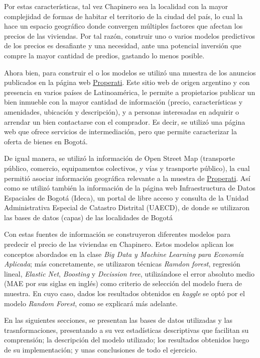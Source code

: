 \documentclass[
  11pt,
  letterpaper,
]{article}
\begin{document}
Por estas características, tal vez Chapinero sea la localidad con la mayor complejidad de formas de habitar el territorio de la ciudad del país, lo cual la hace un espacio geográfico donde convergen múltiples factores que afectan los precios de las viviendas. Por tal razón, construir uno o varios modelos predictivos de los precios es desafiante y una necesidad, ante una potencial inversión que compre la mayor cantidad de predios, gastando lo menos posible.

Ahora bien, para construir el o los modelos se utilizó una muestra de los anuncios publicados en la página web \href{ https://www.properati.com.co/}{Properati}. Este sitio web de origen argentino y con presencia en varios países de Latinoamérica, le permite a propietarios publicar un bien inmueble con la mayor cantidad de información (precio, características y amenidades, ubicación y descripción), y a personas interesadas en adquirir o arrendar un bien contactarse con el comprador. Es decir, se utilizó una página web que ofrece servicios de intermediación, pero que permite caracterizar la oferta de bienes en Bogotá.

De igual manera, se utilizó la información de Open Street Map (transporte público, comercio, equipamentos colectivos, y vías y trasnporte público), la cual permitió asociar información geográfica relevante a la muestra de \href{ https://www.properati.com.co/}{Properati}. Así como se utilizó también la información de la página web Infraestructura de Datos Espaciales de Bogotá (Ideca), un portal de libre acceso y consulta de la Unidad Administrativa Especial de Catastro Distrital (UAECD), de donde se utilizaron las bases de datos (capas) de las localidades de Bogotá

Con estas fuentes de información se construyeron diferentes modelos para predecir el precio de las viviendas en Chapinero. Estos modelos aplican los conceptos abordados en la clase \textit{Big Data y Machine Learning para Economía Aplicada}; más concretamente, se utilizaron técnicas \textit{Ramdon forest}, regresión lineal, \textit{Elastic Net}, \textit{Boosting} y \textit{Decission tree}, utilizándose el error absoluto medio (MAE por sus siglas en inglés) como criterio de selección del modelo fuera de muestra. En cuyo caso, dados los resultados obtenidos en \textit{kaggle} se optó por el modelo \textit{Random Forest}, como se explicará más adelante.

En las siguientes secciones, se presentan las bases de datos utilizadas y las trasnformaciones, presentando a su vez estadísticas descriptivas que facilitan su comprensión; la descripción del modelo utilizado; los resultados obtenidos luego de su implementación; y unas conclusiones de todo el ejercicio.
\end{document}
